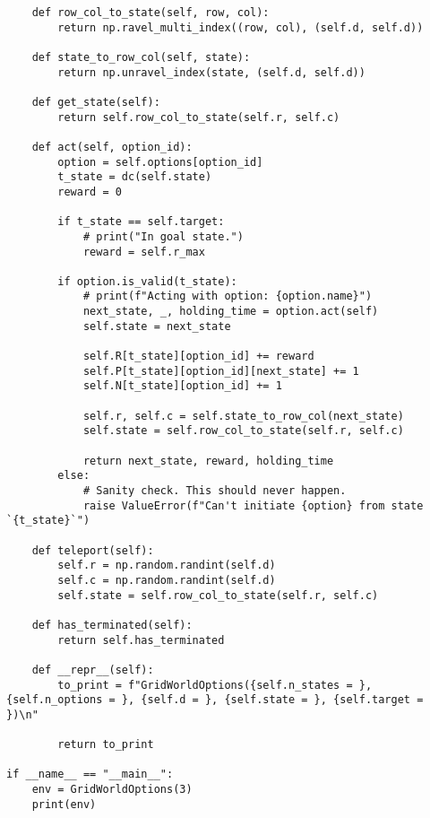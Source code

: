 \begin{verbatim}
    def row_col_to_state(self, row, col):
        return np.ravel_multi_index((row, col), (self.d, self.d))

    def state_to_row_col(self, state):
        return np.unravel_index(state, (self.d, self.d))

    def get_state(self):
        return self.row_col_to_state(self.r, self.c)

    def act(self, option_id):
        option = self.options[option_id]
        t_state = dc(self.state)
        reward = 0

        if t_state == self.target:
            # print("In goal state.")
            reward = self.r_max

        if option.is_valid(t_state):
            # print(f"Acting with option: {option.name}")
            next_state, _, holding_time = option.act(self)
            self.state = next_state

            self.R[t_state][option_id] += reward
            self.P[t_state][option_id][next_state] += 1
            self.N[t_state][option_id] += 1

            self.r, self.c = self.state_to_row_col(next_state)
            self.state = self.row_col_to_state(self.r, self.c)

            return next_state, reward, holding_time
        else:
            # Sanity check. This should never happen.
            raise ValueError(f"Can't initiate {option} from state `{t_state}`")

    def teleport(self):
        self.r = np.random.randint(self.d)
        self.c = np.random.randint(self.d)
        self.state = self.row_col_to_state(self.r, self.c)

    def has_terminated(self):
        return self.has_terminated

    def __repr__(self):
        to_print = f"GridWorldOptions({self.n_states = }, {self.n_options = }, {self.d = }, {self.state = }, {self.target = })\n"

        return to_print

if __name__ == "__main__":
    env = GridWorldOptions(3)
    print(env)
\end{verbatim}

\newpage
